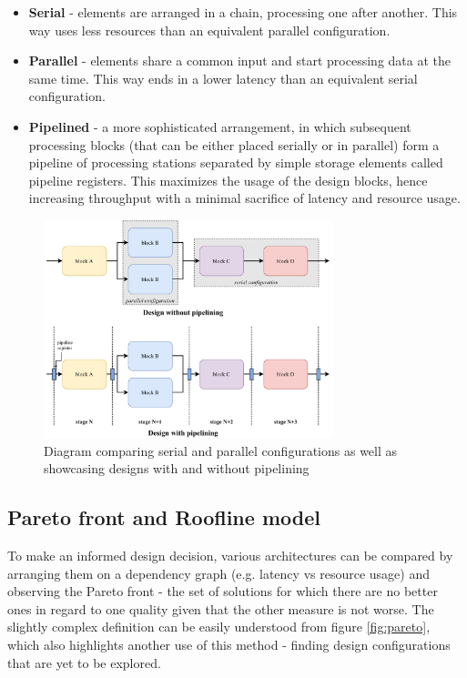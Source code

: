 \begin{itemize}
  \item \textbf{Serial} - elements are arranged in a chain, processing one after another. This way uses less resources than an equivalent parallel configuration.
  \item \textbf{Parallel} - elements share a common input and start processing data at the same time. This way ends in a lower latency than an equivalent serial configuration.
  \item \textbf{Pipelined} - a more sophisticated arrangement, in which subsequent processing blocks (that can be either placed serially or in parallel) form a pipeline of processing stations separated by simple storage elements called pipeline registers. This maximizes the usage of the design blocks, hence increasing throughput with a minimal sacrifice of latency and resource usage.
\end{itemize}

\begin{figure}[hpt!]
  \centering
  \includegraphics[trim={0cm 0cm 0cm 0cm}, width=0.75\textwidth, center]{background/serial_parallel_pipelined.pdf}
  \caption{Diagram comparing serial and parallel configurations as well as showcasing designs with and without pipelining}
  \label{fig:serial-parallel-pipelined}
\end{figure}

\pagebreak
\subsection{Pareto front and Roofline model}
To make an informed design decision, various architectures can be compared by arranging them on a dependency graph (e.g. latency vs resource usage) and observing the Pareto front - the set of solutions for which there are no better ones in regard to one quality given that the other measure is not worse. The slightly complex definition can be easily understood from figure \ref{fig:pareto}, which also highlights another use of this method - finding design configurations that are yet to be explored.

